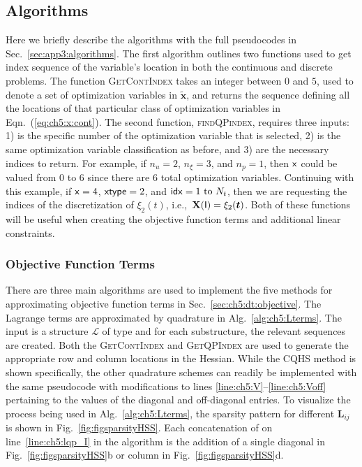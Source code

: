 

\subsection{Algorithms}

Here we briefly describe the algorithms with the full pseudocodes in Sec.~\ref{sec:app3:algorithms}.
The first algorithm outlines two functions used to get index sequence of the variable's location in both the continuous and discrete problems.
The function \textsc{GetContIndex} takes an integer between $0$ and $5$, used to denote a set of optimization variables in $\tilde{\bm{x}}$, and returns the sequence defining all the locations of that particular class of optimization variables in Eqn.~(\ref{eq:ch5:x:cont}).
The second function, \textsc{findQPindex}, requires three inputs: 1)  is the specific number of the optimization variable that is selected, 2)  is the same optimization variable classification as before, and 3)  are the necessary indices to return.
For example, if $n_u = 2$, $n_{\xi} = 3$, and $n_{p} = 1$, then $\textup{\textsf{x}}$ could be valued from $0$ to $6$ since there are $6$ total optimization variables.
Continuing with this example, if $\textup{\textsf{x}} = 4$, $\textup{\textsf{xtype}} = 2$, and $\textup{\textsf{idx}} = 1 \text{ to } N_t$, then we are requesting the indices of the discretization of $\xi_2(t)$, i.e.,~$\mathbf{X}(\textup{\textsf{I}}) = \xi_2(\bm{t})$.
Both of these functions will be useful when creating the objective function terms and additional linear constraints.

\subsubsection{Objective Function Terms} \label{sec:ch5:alg:objective}

There are three main algorithms are used to implement the five methods for approximating objective function terms in Sec.~\ref{sec:ch5:dt:objective}.
The Lagrange terms are approximated by quadrature in Alg.~\ref{alg:ch5:Lterms}.
The input is a structure $\mathcal{L}$ of type  and for each substructure, the relevant sequences are created.
Both the \textsc{GetContIndex} and \textsc{GetQPIndex} are used to generate the appropriate row and column locations in the Hessian.
While the CQHS method is shown specifically, the other quadrature schemes can readily be implemented with the same pseudocode with modifications to lines \ref{line:ch5:V}--\ref{line:ch5:Voff} pertaining to the values of the diagonal and off-diagonal entries.
To visualize the process being used in Alg.~\ref{alg:ch5:Lterms}, the sparsity pattern for different $\bm{L}_{ij}$ is shown in Fig.~\ref{fig:figsparsityHSS}.
Each concatenation of  on line~\ref{line:ch5:lqp_I} in the algorithm is the addition of a single diagonal in Fig.~\ref{fig:figsparsityHSS}b or column in Fig.~\ref{fig:figsparsityHSS}d.


